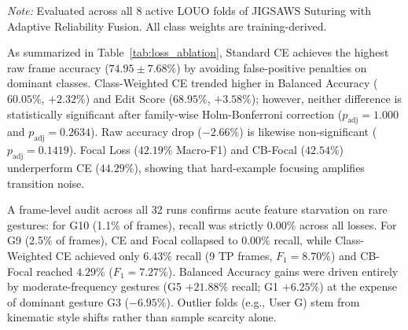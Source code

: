 \documentclass[10pt,journal]{IEEEtran}
\begin{document}
\begin{table}[t]
\centering
\caption{Class-Imbalance and Loss Formulation Ablation on Suturing (8 LOUO Folds)}
\label{tab:loss_ablation}
\vspace{2pt}
\par\noindent\footnotesize\textit{Note:} Evaluated across all 8 active LOUO folds of JIGSAWS Suturing with Adaptive Reliability Fusion. All class weights are training-derived.\par
\end{table}

As summarized in Table~\ref{tab:loss_ablation}, Standard CE achieves the highest raw frame accuracy ($74.95 \pm 7.68\%$) by avoiding false-positive penalties on dominant classes. Class-Weighted CE trended higher in Balanced Accuracy ($60.05\%$, $+2.32\%$) and Edit Score ($68.95\%$, $+3.58\%$); however, neither difference is statistically significant after family-wise Holm-Bonferroni correction ($p_{\text{adj}} = 1.000$ and $p_{\text{adj}} = 0.2634$). Raw accuracy drop ($-2.66\%$) is likewise non-significant ($p_{\text{adj}} = 0.1419$). Focal Loss ($42.19\%$ Macro-F1) and CB-Focal ($42.54\%$) underperform CE ($44.29\%$), showing that hard-example focusing amplifies transition noise.

A frame-level audit across all 32 runs confirms acute feature starvation on rare gestures: for G10 (1.1\% of frames), recall was strictly $0.00\%$ across all losses. For G9 (2.5\% of frames), CE and Focal collapsed to $0.00\%$ recall, while Class-Weighted CE achieved only $6.43\%$ recall (9 TP frames, $F_1 = 8.70\%$) and CB-Focal reached $4.29\%$ ($F_1 = 7.27\%$). Balanced Accuracy gains were driven entirely by moderate-frequency gestures (G5 $+21.88\%$ recall; G1 $+6.25\%$) at the expense of dominant gesture G3 ($-6.95\%$). Outlier folds (e.g., User G) stem from kinematic style shifts rather than sample scarcity alone.
\end{document}
